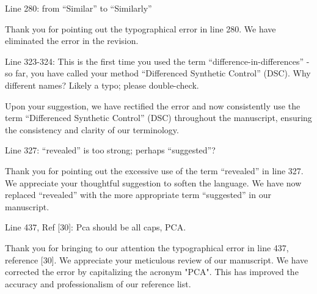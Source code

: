 \RC{} Line 280: from ``Similar'' to ``Similarly''

\AR{} Thank you for pointing out the typographical error in line 280. We have eliminated the error in the revision.

\RC{} Line 323-324: This is the first time you used the term ``difference-in-differences'' -so far, you have called your method ``Differenced Synthetic Control'' (DSC). Why different names? Likely a typo; please double-check.

\AR{} Upon your suggestion, we have rectified the error and now consistently use the term ``Differenced Synthetic Control'' (DSC) throughout the manuscript, ensuring the consistency and clarity of our terminology.

\RC{} Line 327: ``revealed'' is too strong; perhaps ``suggested''?

\AR{} Thank you for pointing out the excessive use of the term ``revealed'' in line 327. We appreciate your thoughtful suggestion to soften the language. We have now replaced ``revealed'' with the more appropriate term ``suggested'' in our manuscript.

\RC{} Line 437, Ref [30]: Pca should be all caps, PCA.\

\AR{} Thank you for bringing to our attention the typographical error in line 437, reference [30]. We appreciate your meticulous review of our manuscript. We have corrected the error by capitalizing the acronym "PCA". This has improved the accuracy and professionalism of our reference list.


